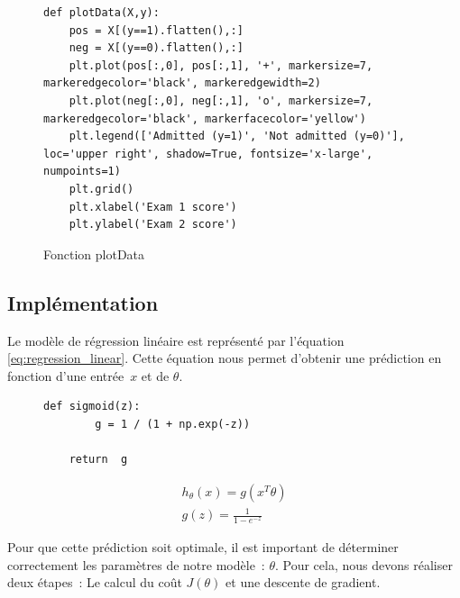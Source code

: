 \begin{figure}[!h]
\begin{verbatim}
def plotData(X,y):
    pos = X[(y==1).flatten(),:]
    neg = X[(y==0).flatten(),:]
    plt.plot(pos[:,0], pos[:,1], '+', markersize=7, markeredgecolor='black', markeredgewidth=2) 
    plt.plot(neg[:,0], neg[:,1], 'o', markersize=7, markeredgecolor='black', markerfacecolor='yellow') 
    plt.legend(['Admitted (y=1)', 'Not admitted (y=0)'], loc='upper right', shadow=True, fontsize='x-large', numpoints=1) 
    plt.grid()
    plt.xlabel('Exam 1 score')
    plt.ylabel('Exam 2 score')
\end{verbatim}   
\caption{Fonction plotData}
\end{figure}

    \subsection{Implémentation}

    Le modèle de régression linéaire est représenté par l'équation \ref{eq:regression_linear}. Cette équation nous permet d'obtenir une prédiction en fonction d'une entrée~$x$ et de $\theta$.
    
\begin{figure}[!h]
    \begin{minipage}{.48\linewidth}
\begin{verbatim}
def sigmoid(z):
        g = 1 / (1 + np.exp(-z))

    return  g
\end{verbatim}   
    \end{minipage}\hfill
    \begin{minipage}{.48\linewidth}
        \begin{align}\label{eq:regression_linear}
            h_\theta(x) = g (x^T \theta ) \\
            g(z)=\frac{1}{1-e^{-z}} 
        \end{align}
\end{minipage}
\end{figure}
    
    \noindent
    Pour que cette prédiction soit optimale, il est important de déterminer correctement les paramètres de notre modèle~: $\theta$. Pour cela, nous devons réaliser deux étapes~: Le calcul du coût $J(\theta)$ et une descente de gradient.

